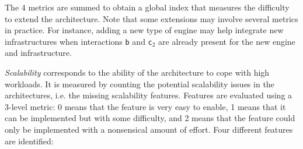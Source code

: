 \documentclass[preprint,3p,twocolumn]{elsarticle}
\newcommand{\note}[2]{\pdfmargincomment[color=yellow,author=#1,open=true]{#2}}
\newcommand{\closednote}[4]{} %
\begin{document}
The 4 metrics are summed to obtain a global index that measures the
difficulty to extend the architecture. Note that some extensions may
involve several metrics in practice. For instance, adding a new type
of engine may help integrate new infrastructures when interactions
\texttt{b} and \texttt{c$_2$} are already present for the new engine
and infrastructure.  \closednote{Rafael}{Adding a new engine type may
  also allow run in different infrastructures. Maybe it is worth to
  put a sentence to clarify that the metric account for it
  separately.}{Tristan}{It will not *allow* because interaction c1
  would still need to be developed. But it will definitely facilitate
  it. I added a note on this after the description of the metrics.}


\emph{Scalability} corresponds to the ability of the architecture to
cope with high workloads. It is measured by counting the potential
scalability issues in the architectures, i.e. the missing scalability
features. Features are evaluated using a 3-level metric: 0 means that
the feature is very easy to enable, 1 means that it can be implemented
but with some difficulty, and 2 means that the feature could only be
implemented with a nonsensical amount of effort. Four different
features are identified:
\end{document}
